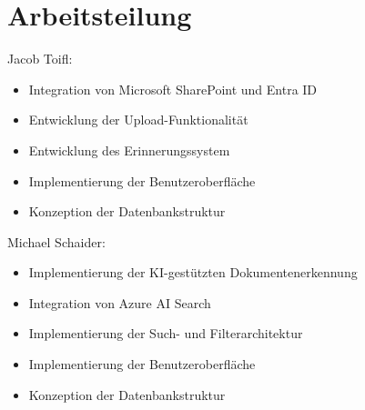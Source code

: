 \section{Arbeitsteilung}

Jacob Toifl:
\begin{itemize}
    \item Integration von Microsoft SharePoint und Entra ID
    \item Entwicklung der Upload-Funktionalität
    \item Entwicklung des Erinnerungssystem
    \item Implementierung der Benutzeroberfläche
    \item Konzeption der Datenbankstruktur
\end{itemize}

\vspace{0.5cm}
Michael Schaider:
\begin{itemize}
    \item Implementierung der KI-gestützten Dokumentenerkennung
    \item Integration von Azure AI Search
    \item Implementierung der Such- und Filterarchitektur
    \item Implementierung der Benutzeroberfläche
    \item Konzeption der Datenbankstruktur
\end{itemize}

